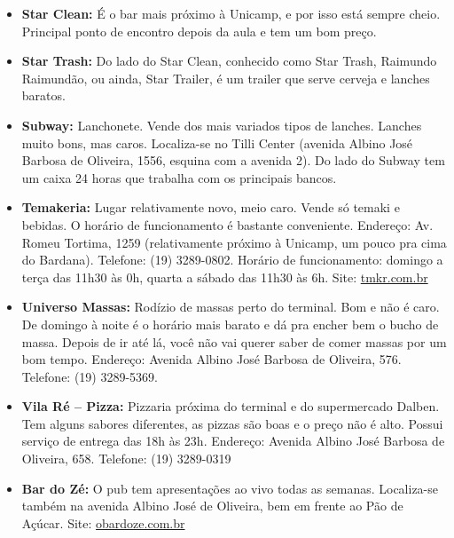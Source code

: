 \begin{itemize}
\item  \textbf{Star Clean:} É o bar mais próximo à Unicamp, e por isso está sempre cheio. Principal ponto de encontro depois da aula e tem um bom preço.

\item  \textbf{Star Trash:} Do lado do Star Clean, conhecido como Star Trash, Raimundo Raimundão, ou ainda, Star Trailer, é um trailer que serve cerveja e lanches baratos.

\item  \textbf{Subway:} Lanchonete. Vende dos mais variados tipos de lanches. Lanches muito bons, mas caros. Localiza-se no Tilli Center (avenida Albino José Barbosa de Oliveira, 1556, esquina com a avenida 2). Do lado do Subway tem um caixa 24 horas que trabalha com os principais bancos.

\item  \textbf{Temakeria:} Lugar relativamente novo, meio caro. Vende só temaki e bebidas. O horário de funcionamento é bastante conveniente. Endereço: Av. Romeu Tortima, 1259 (relativamente próximo à Unicamp, um pouco pra cima do Bardana). Telefone: (19) 3289-0802. Horário de funcionamento: domingo a terça das 11h30 às 0h, quarta a sábado das 11h30 às 6h. Site: \url{tmkr.com.br}

\item  \textbf{Universo Massas:} Rodízio de massas perto do terminal. Bom e não é caro. De domingo à noite é o horário mais barato e dá pra encher bem o bucho de massa. Depois de ir até lá, você não vai querer saber de comer massas por um bom tempo. Endereço: Avenida Albino José Barbosa de Oliveira, 576. Telefone: (19) 3289-5369.

\item  \textbf{Vila Ré -- Pizza:} Pizzaria próxima do terminal e do supermercado Dalben. Tem alguns sabores diferentes, as pizzas são boas e o preço não é alto. Possui serviço de entrega das 18h às 23h. Endereço: Avenida Albino José Barbosa de Oliveira, 658. Telefone: (19) 3289-0319

\item  \textbf{Bar do Zé:} O pub tem apresentações ao vivo todas as semanas. Localiza-se também na avenida Albino José de Oliveira, bem em frente ao Pão de Açúcar. Site: \url{obardoze.com.br}
\end{itemize}
